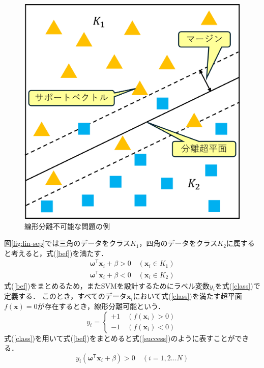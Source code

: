 \documentclass[11pt,a4paper,titlepage]{ltjsarticle}
\begin{document}
\begin{figure}[H]
\begin{minipage}[b]{0.45\textwidth}
        \includegraphics[width=1.0\columnwidth]{image/nonlinear-separative.png}
        \caption{線形分離不可能な問題の例}
        \label{fig:nonlin-sep}
    \end{minipage}
\end{figure}
図\ref{fig:lin-sep}では三角のデータをクラス$K_1$，四角のデータをクラス$K_2$に属すると考えると，式(\ref{bef})を満たす．
\begin{equation}
    \label{bef}
    \begin{split}
        \bm{\omega}^\mathsf{T}\bm{x}_i + \beta > 0\quad (\bm{x}_i \in K_1)\\
        \bm{\omega}^\mathsf{T}\bm{x}_i + \beta < 0\quad (\bm{x}_i \in K_2)
    \end{split}
\end{equation}
\clearpage
式(\ref{bef})をまとめるため，またSVMを設計するためにラベル変数$y_i$を式(\ref{class})で定義する．
このとき，すべてのデータ$\bm{x}_i$において式(\ref{class})を満たす超平面$f(\bm{x}) = 0$が存在するとき，線形分離可能という．
\begin{equation}
    \label{class}
    y_i =
    \begin{cases}
        +1 \quad(f(\bm{x}_i) > 0)\\
        -1 \quad(f(\bm{x}_i) < 0)
    \end{cases}
\end{equation}
式(\ref{class})を用いて式(\ref{bef})をまとめると式(\ref{success})のように表すことができる．
\begin{equation}
    \label{success}
    y_i(\bm{\omega}^\mathsf{T}\bm{x}_i + \beta) > 0\quad(i = 1,2 \dots N)
\end{equation}
\end{document}
